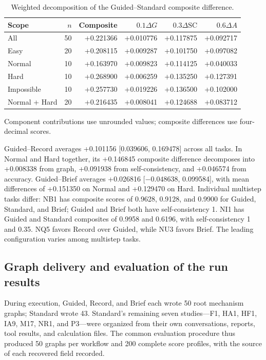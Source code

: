 \begin{table}[!htbp]
\centering
\small
\caption{Weighted decomposition of the Guided--Standard composite difference.}
\label{tab:si-weighted-gain}
\begin{tabular}{lrrrrr}
\toprule
Scope & $n$ & Composite & $0.1\Delta G$ & $0.3\Delta\mathrm{SC}$ & $0.6\Delta A$ \\
\midrule
All & 50 & +0.221366 & +0.010776 & +0.117875 & +0.092717 \\
Easy & 20 & +0.208115 & +0.009287 & +0.101750 & +0.097082 \\
Normal & 10 & +0.163970 & +0.009823 & +0.114125 & +0.040033 \\
Hard & 10 & +0.268900 & +0.006259 & +0.135250 & +0.127391 \\
Impossible & 10 & +0.257730 & +0.019226 & +0.136500 & +0.102000 \\
Normal + Hard & 20 & +0.216435 & +0.008041 & +0.124688 & +0.083712 \\
\bottomrule
\end{tabular}
\par\smallskip\begin{minipage}{\linewidth}\footnotesize Component contributions use unrounded values; composite differences use four-decimal scores.\end{minipage}
\end{table}

Guided--Record averages +0.101156 [0.039606, 0.169478] across all tasks. In Normal and Hard together, its +0.146845 composite difference decomposes into +0.008338 from graph, +0.091938 from self-consistency, and +0.046574 from accuracy. Guided--Brief averages +0.026816 [$-0.048638$, 0.099584], with mean differences of +0.151350 on Normal and +0.129470 on Hard. Individual multistep tasks differ: NB1 has composite scores of 0.9628, 0.9128, and 0.9900 for Guided, Standard, and Brief; Guided and Brief both have self-consistency 1. NI1 has Guided and Standard composites of 0.9958 and 0.6196, with self-consistency 1 and 0.35. NQ5 favors Record over Guided, while NU3 favors Brief. The leading configuration varies among multistep tasks.

\subsection{Graph delivery and evaluation of the run results}

During execution, Guided, Record, and Brief each wrote 50 root mechanism graphs; Standard wrote 43. Standard's remaining seven studies---F1, HA1, HF1, IA9, M17, NR1, and P3---were organized from their own conversations, reports, tool results, and calculation files. The common evaluation procedure thus produced 50 graphs per workflow and 200 complete score profiles, with the source of each recovered field recorded.

